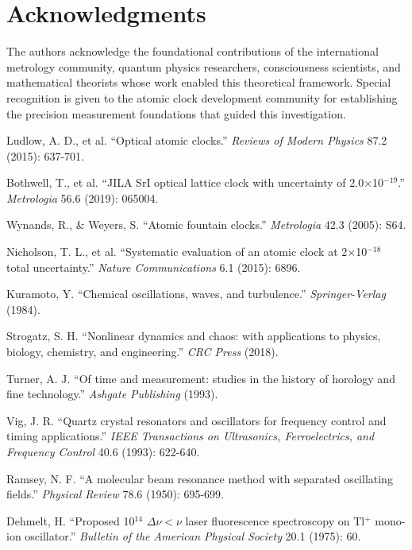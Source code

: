 \documentclass[11pt]{article}
\theoremstyle{remark}
\begin{document}
\section*{Acknowledgments}

The authors acknowledge the foundational contributions of the international metrology community, quantum physics researchers, consciousness scientists, and mathematical theorists whose work enabled this theoretical framework. Special recognition is given to the atomic clock development community for establishing the precision measurement foundations that guided this investigation.

\begin{thebibliography}{99}

Ludlow, A. D., et al. ``Optical atomic clocks.'' \textit{Reviews of Modern Physics} 87.2 (2015): 637-701.

Bothwell, T., et al. ``JILA SrI optical lattice clock with uncertainty of 2.0×10$^{-19}$.'' \textit{Metrologia} 56.6 (2019): 065004.

Wynands, R., \& Weyers, S. ``Atomic fountain clocks.'' \textit{Metrologia} 42.3 (2005): S64.

Nicholson, T. L., et al. ``Systematic evaluation of an atomic clock at 2×10$^{-18}$ total uncertainty.'' \textit{Nature Communications} 6.1 (2015): 6896.

Kuramoto, Y. ``Chemical oscillations, waves, and turbulence.'' \textit{Springer-Verlag} (1984).

Strogatz, S. H. ``Nonlinear dynamics and chaos: with applications to physics, biology, chemistry, and engineering.'' \textit{CRC Press} (2018).

Turner, A. J. ``Of time and measurement: studies in the history of horology and fine technology.'' \textit{Ashgate Publishing} (1993).

Vig, J. R. ``Quartz crystal resonators and oscillators for frequency control and timing applications.'' \textit{IEEE Transactions on Ultrasonics, Ferroelectrics, and Frequency Control} 40.6 (1993): 622-640.

Ramsey, N. F. ``A molecular beam resonance method with separated oscillating fields.'' \textit{Physical Review} 78.6 (1950): 695-699.

Dehmelt, H. ``Proposed 10$^{14}$ $\Delta\nu < \nu$ laser fluorescence spectroscopy on Tl$^+$ mono-ion oscillator.'' \textit{Bulletin of the American Physical Society} 20.1 (1975): 60.


\end{thebibliography}
\end{document}
